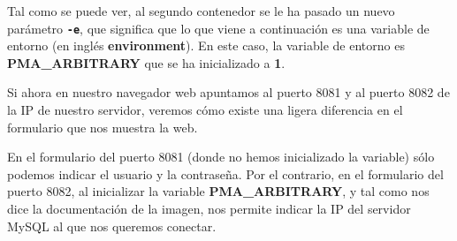 Tal como se puede ver, al segundo contenedor se le ha pasado un nuevo parámetro \textbf{\texttt{-e}}, que significa que lo que viene a continuación es una variable de entorno (en inglés \textbf{environment}). En este caso, la variable de entorno es \textbf{PMA\_ARBITRARY} que se ha inicializado a \textbf{1}.

Si ahora en nuestro navegador web apuntamos al puerto 8081 y al puerto 8082 de la IP de nuestro servidor, veremos cómo existe una ligera diferencia en el formulario que nos muestra la web.

En el formulario del puerto 8081 (donde no hemos inicializado la variable) sólo podemos indicar el usuario y la contraseña. Por el contrario, en el formulario del puerto 8082, al inicializar la variable \textbf{PMA\_ARBITRARY}, y tal como nos dice la documentación de la imagen, nos permite indicar la IP del servidor MySQL al que nos queremos conectar.

